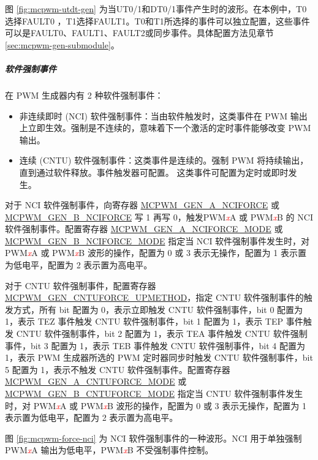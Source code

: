 \documentclass[main\_\_CN.tex]{subfiles}
\begin{document}
图 \ref{fig:mcpwm-utdt-gen} 为当UT0/1和DT0/1事件产生时的波形。在本例中，T0选择FAULT0 ，T1选择FAULT1。T0和T1所选择的事件可以独立配置，这些事件可以是FAULT0、FAULT1、FAULT2或同步事件。具体配置方法见章节 \ref{sec:mcpwm-gen-submodule}。

\subparagraph{软件强制事件}
在 PWM 生成器内有 2 种软件强制事件：
\begin{itemize}
    \item 非连续即时 (NCI) 软件强制事件：当由软件触发时，这类事件在 PWM 输出上立即生效。强制是不连续的，意味着下一个激活的定时事件能够改变 PWM 输出。

    \item 连续 (CNTU) 软件强制事件：这类事件是连续的。强制 PWM 将持续输出，直到通过软件释放。事件触发器可配置。 这类事件可配置为定时或即时发生。
\end{itemize}

对于 NCI 软件强制事件，向寄存器 \hyperref[fielddesc:MCPWMGENNANCIFORCE]{MCPWM\_GEN\_A\_NCIFORCE} 或 \hyperref[fielddesc:MCPWMGENNBNCIFORCE]{MCPWM\_GEN\_B\_NCIFORCE} 写 1 再写 0，触发PWM\textcolor{red}{\it{x}}A 或 PWM\textcolor{red}{\it{x}}B 的 NCI 软件强制事件。配置寄存器 \hyperref[fielddesc:MCPWMGENNANCIFORCEMODE]{MCPWM\_GEN\_A\_NCIFORCE\_MODE} 或 \hyperref[fielddesc:MCPWMGENNBNCIFORCEMODE]{MCPWM\_GEN\_B\_NCIFORCE\_MODE} 指定当 NCI 软件强制事件发生时，对 PWM\textcolor{red}{\it{x}}A 或 PWM\textcolor{red}{\it{x}}B 波形的操作，配置为 0 或 3 表示无操作，配置为 1 表示置为低电平，配置为 2 表示置为高电平。

对于 CNTU 软件强制事件，配置寄存器 \hyperref[fielddesc:MCPWMGENNCNTUFORCEUPMETHOD]{MCPWM\_GEN\_CNTUFORCE\_UPMETHOD}，指定 CNTU 软件强制事件的触发方式，所有 bit 配置为 0，表示立即触发 CNTU 软件强制事件，bit 0 配置为 1，表示 TEZ 事件触发 CNTU 软件强制事件，bit 1 配置为 1，表示 TEP 事件触发 CNTU 软件强制事件，bit 2 配置为 1，表示 TEA 事件触发 CNTU 软件强制事件，bit 3 配置为 1，表示 TEB 事件触发 CNTU 软件强制事件，bit 4 配置为 1，表示 PWM 生成器所选的 PWM 定时器同步时触发 CNTU 软件强制事件，bit 5 配置为 1，表示不触发 CNTU 软件强制事件。配置寄存器 \hyperref[fielddesc:MCPWMGENNACNTUFORCEMODE]{MCPWM\_GEN\_A\_CNTUFORCE\_MODE} 或 \hyperref[fielddesc:MCPWMGENNBCNTUFORCEMODE]{MCPWM\_GEN\_B\_CNTUFORCE\_MODE} 指定当 CNTU 软件强制事件发生时，对 PWM\textcolor{red}{\it{x}}A 或 PWM\textcolor{red}{\it{x}}B 波形的操作，配置为 0 或 3 表示无操作，配置为 1 表示置为低电平，配置为 2 表示置为高电平。

图 \ref{fig:mcpwm-force-nci} 为 NCI 软件强制事件的一种波形。NCI 用于单独强制 PWM\textcolor{red}{\it{x}}A 输出为低电平，PWM\textcolor{red}{\it{x}}B 不受强制事件控制。
\end{document}
